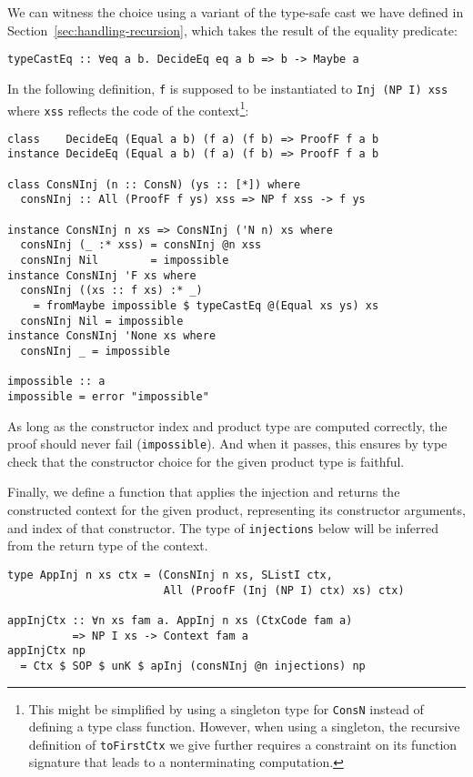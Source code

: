 \documentclass[runningheads]{llncs}
\newcommand{\K}[1]{\lstinline{#1}}
\begin{document}
We can witness the choice using a variant of the type-safe cast we have defined in Section~\ref{sec:handling-recursion}, which takes the result of the equality predicate:
\begin{lstlisting}
typeCastEq :: ∀eq a b. DecideEq eq a b => b -> Maybe a
\end{lstlisting}
In the following definition, \K{f} is supposed to be instantiated to \K{Inj (NP I) xss} where \K{xss} reflects the code of the context\footnote{This might be simplified by using a singleton type for \K{ConsN} instead of defining a type class function. However, when using a singleton, the recursive definition of \K{toFirstCtx} we give further requires a constraint on its function signature that leads to a nonterminating computation.}:
\begin{lstlisting}
class    DecideEq (Equal a b) (f a) (f b) => ProofF f a b
instance DecideEq (Equal a b) (f a) (f b) => ProofF f a b

class ConsNInj (n :: ConsN) (ys :: [*]) where
  consNInj :: All (ProofF f ys) xss => NP f xss -> f ys

instance ConsNInj n xs => ConsNInj ('N n) xs where
  consNInj (_ :* xss) = consNInj @n xss
  consNInj Nil        = impossible
instance ConsNInj 'F xs where
  consNInj ((xs :: f xs) :* _)
    = fromMaybe impossible $ typeCastEq @(Equal xs ys) xs
  consNInj Nil = impossible
instance ConsNInj 'None xs where
  consNInj _ = impossible

impossible :: a
impossible = error "impossible"
\end{lstlisting}
As long as the constructor index and product type are computed correctly, the proof should never fail (\K{impossible}). And when it passes, this ensures by type check that the constructor choice for the given product type is faithful.

Finally, we define a function that applies the injection and returns the constructed context for the given product, representing its constructor arguments, and index of that constructor. The type of \K{injections} below will be inferred from the return type of the context.
\begin{lstlisting}
type AppInj n xs ctx = (ConsNInj n xs, SListI ctx,
                        All (ProofF (Inj (NP I) ctx) xs) ctx)

appInjCtx :: ∀n xs fam a. AppInj n xs (CtxCode fam a)
          => NP I xs -> Context fam a
appInjCtx np
  = Ctx $ SOP $ unK $ apInj (consNInj @n injections) np
\end{lstlisting}
\end{document}
